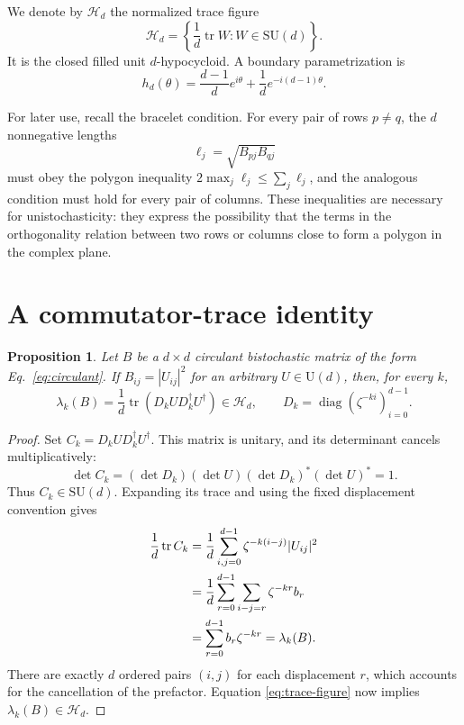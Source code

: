 \documentclass[aip,jmp,preprint,onecolumn,nofootinbib]{revtex4-2}
\newtheorem{proposition}{Proposition}
\newcommand{\Hd}{\mathcal H_d}
\begin{document}
We denote by $\Hd$ the normalized trace figure
\begin{equation}
 \Hd=\left\{\frac{1}{d}\operatorname{tr}W:W\in\mathrm{SU}(d)\right\}.
 \label{eq:trace-figure}
\end{equation}
It is the closed filled unit $d$-hypocycloid.\cite{Kaiser2006}  A boundary
parametrization is
\begin{equation}
 h_d(\theta)=\frac{d-1}{d}e^{i\theta}
              +\frac{1}{d}e^{-i(d-1)\theta}.
 \label{eq:hypocycloid}
\end{equation}

For later use, recall the bracelet condition.  For every pair of rows
$p\neq q$, the $d$ nonnegative lengths
\begin{equation}
 \ell_j=\sqrt{B_{pj}B_{qj}}
 \label{eq:bracelet-lengths}
\end{equation}
must obey the polygon inequality
$2\max_j\ell_j\leq\sum_j\ell_j$, and the analogous condition must hold for
every pair of columns.  These inequalities are necessary for
unistochasticity: they express the possibility that the terms in the
orthogonality relation between two rows or columns close to form a polygon in
the complex plane.\cite{RajchelMieldzioc2022}

\section{A commutator-trace identity}

\begin{proposition}
Let $B$ be a $d\times d$ circulant bistochastic matrix of the form
Eq.~\eqref{eq:circulant}.  If $B_{ij}=|U_{ij}|^2$ for an arbitrary
$U\in\mathrm U(d)$, then, for every $k$,
\begin{equation}
 \lambda_k(B)=\frac{1}{d}\operatorname{tr}
 \left(D_kUD_k^\dagger U^\dagger\right)\in\Hd,
 \qquad
 D_k=\operatorname{diag}\!\left(\zeta^{-ki}\right)_{i=0}^{d-1}.
 \label{eq:main-identity}
\end{equation}
\end{proposition}

\begin{proof}
Set $C_k=D_kUD_k^\dagger U^\dagger$.  This matrix is unitary, and its
determinant cancels multiplicatively:
\begin{equation}
 \det C_k=(\det D_k)(\det U)(\det D_k)^*(\det U)^*=1.
 \label{eq:determinant}
\end{equation}
Thus $C_k\in\mathrm{SU}(d)$.  Expanding its trace and using the fixed
displacement convention gives
\begin{align}
 \frac{1}{d}\operatorname{tr}C_k
 &=\frac{1}{d}\sum_{i,j=0}^{d-1}
     \zeta^{-k(i-j)}|U_{ij}|^2 \notag\\
 &=\frac{1}{d}\sum_{r=0}^{d-1}
     \sum_{i-j=r}\zeta^{-kr}b_r \notag\\
 &=\sum_{r=0}^{d-1}b_r\zeta^{-kr}
 =\lambda_k(B).
 \label{eq:trace-expansion}
\end{align}
There are exactly $d$ ordered pairs $(i,j)$ for each displacement $r$, which
accounts for the cancellation of the prefactor.  Equation
\eqref{eq:trace-figure} now implies $\lambda_k(B)\in\Hd$.
\end{proof}
\end{document}

